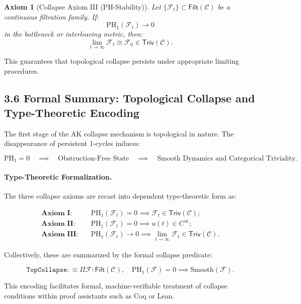\documentclass[11pt]{article}
\newtheorem{axiom}{Axiom}[section]
\begin{document}
\begin{axiom}[Collapse Axiom III (PH-Stability)]
Let \( \{ \mathcal{F}_t \} \subset \mathsf{Filt}(\mathcal{C}) \) be a continuous filtration family.  
If:
\[
\mathrm{PH}_1(\mathcal{F}_t) \longrightarrow 0
\]
in the bottleneck or interleaving metric, then:
\[
\lim_{t \to \infty} \mathcal{F}_t \cong \mathcal{F}_0 \in \mathsf{Triv}(\mathcal{C}).
\]
\end{axiom}

This guarantees that topological collapse persists under appropriate limiting procedures.

\subsection*{3.6 Formal Summary: Topological Collapse and Type-Theoretic Encoding}

The first stage of the AK collapse mechanism is topological in nature. The disappearance of persistent 1-cycles induces:

\[
\mathrm{PH}_1 = 0 \quad \implies \quad \text{Obstruction-Free State} \quad \implies \quad \text{Smooth Dynamics and Categorical Triviality}.
\]

\paragraph{Type-Theoretic Formalization.}
The three collapse axioms are recast into dependent type-theoretic form as:

\begin{align*}
\textbf{Axiom I:} &\quad \mathrm{PH}_1(\mathcal{F}_t) = 0 \implies \mathcal{F}_t \in \mathsf{Triv}(\mathcal{C}); \\
\textbf{Axiom II:} &\quad \mathrm{PH}_1(\mathcal{F}_t) = 0 \implies u(t) \in C^\infty; \\
\textbf{Axiom III:} &\quad \mathrm{PH}_1(\mathcal{F}_t) \longrightarrow 0 \implies \lim_{t \to \infty} \mathcal{F}_t \in \mathsf{Triv}(\mathcal{C}).
\end{align*}

Collectively, these are summarized by the formal collapse predicate:

\[
\texttt{TopCollapse} :\equiv \Pi \mathcal{F} : \mathsf{Filt}(\mathcal{C}), \quad \mathrm{PH}_1(\mathcal{F}) = 0 \implies \mathrm{Smooth}(\mathcal{F}).
\]

This encoding facilitates formal, machine-verifiable treatment of collapse conditions within proof assistants such as Coq or Lean.
\end{document}
